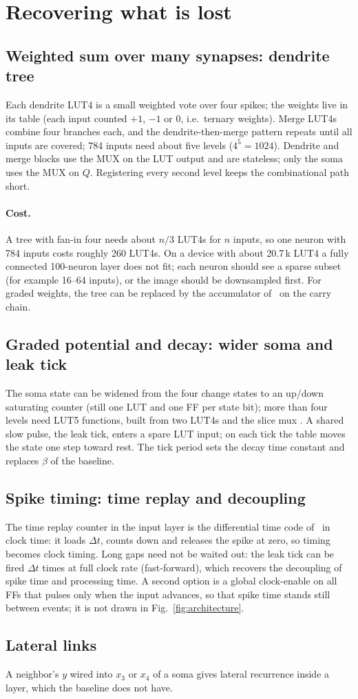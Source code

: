 \section{Recovering what is lost}
\label{sec:recover}

\subsection{Weighted sum over many synapses: dendrite tree}
Each dendrite LUT4 is a small weighted vote over four spikes; the weights live in its table (each input counted $+1$, $-1$ or $0$, i.e.\ ternary weights). Merge LUT4s combine four branches each, and the dendrite-then-merge pattern repeats until all inputs are covered; 784 inputs need about five levels ($4^5=1024$). Dendrite and merge blocks use the MUX on the LUT output and are stateless; only the soma uses the MUX on $Q$. Registering every second level keeps the combinational path short.

\paragraph{Cost.} A tree with fan-in four needs about $n/3$ LUT4s for $n$ inputs, so one neuron with 784 inputs costs roughly 260 LUT4s. On a device with about 20.7\,k LUT4  a fully connected 100-neuron layer does not fit; each neuron should see a sparse subset (for example 16--64 inputs), or the image should be downsampled first. For graded weights, the tree can be replaced by the accumulator of~\cite{windhager2024} on the carry chain.

\subsection{Graded potential and decay: wider soma and leak tick}
The soma state can be widened from the four change states to an up/down saturating counter (still one LUT and one FF per state bit); more than four levels need LUT5 functions, built from two LUT4s and the slice mux . A shared slow pulse, the leak tick, enters a spare LUT input; on each tick the table moves the state one step toward rest. The tick period sets the decay time constant and replaces $\beta$ of the baseline.

\subsection{Spike timing: time replay and decoupling}
The time replay counter in the input layer is the differential time code of~\cite{windhager2024} in clock time: it loads $\Delta t$, counts down and releases the spike at zero, so timing becomes clock timing. Long gaps need not be waited out: the leak tick can be fired $\Delta t$ times at full clock rate (fast-forward), which recovers the decoupling of spike time and processing time. A second option is a global clock-enable on all FFs that pulses only when the input advances, so that spike time stands still between events; it is not drawn in Fig.~\ref{fig:architecture}.

\subsection{Lateral links}
A neighbor's $y$ wired into $x_3$ or $x_4$ of a soma gives lateral recurrence inside a layer, which the baseline does not have.
